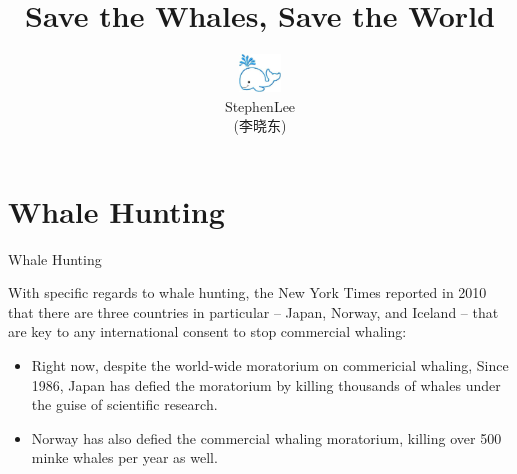 \documentclass[hyperref={unicode}]{beamer}
\begin{document}
\begin{CJK}{UTF8}{gkai}


\title{Save the Whales, Save the World}
\author[StephenLee]{\includegraphics[height=1cm, width=2cm]{logo}\\StephenLee\\(李晓东)}
\renewcommand{\today}{ April 24, 2012}


\begin{frame}
  \maketitle
\end{frame}


\section{Whale Hunting}
\begin{frame}{Whale Hunting}
\begin{block}{With specific regards to whale hunting, the New York Times reported in 2010 that there are three countries in particular -- Japan, Norway, and Iceland -- that are key to any international consent to stop commercial whaling:}
\begin{itemize}
\item Right now, despite the world-wide moratorium on commericial whaling, Since 1986, Japan has defied the moratorium by killing thousands of whales under the guise of \alert{scientific research}.
\pause
\item Norway has also defied the commercial whaling moratorium, killing over \alert{500} minke whales per year as well. 
\end{itemize}
\end{block}
\end{frame}

\end{CJK}
\end{document}
